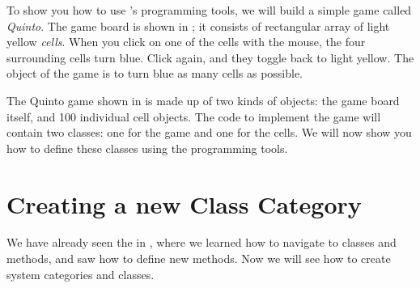 \documentclass[a4paper,10pt,twoside]{book}
\begin{document}
To show you how to use \squeak's programming tools, we will build a simple game called \emph{Quinto}.  The game board is shown in ; it consists of rectangular array of light yellow \emph{cells}.  When you click on one of the cells with the mouse, the four surrounding cells turn blue.  Click again, and they toggle back to light yellow.  The object of the game is to turn blue as many cells as possible.

The Quinto game shown in  is made up of two kinds of objects: the game board itself, and 100 individual cell objects.  The \squeak code to implement the game will contain two classes: one for the game and one for the cells.
We will now show you how to define these classes using the \squeak programming tools.

\section{Creating a new Class Category}

We have already seen the  in , where we learned how to navigate to classes and methods, and saw how to define new methods.
Now we will see how to create system categories and classes.

\end{document}
